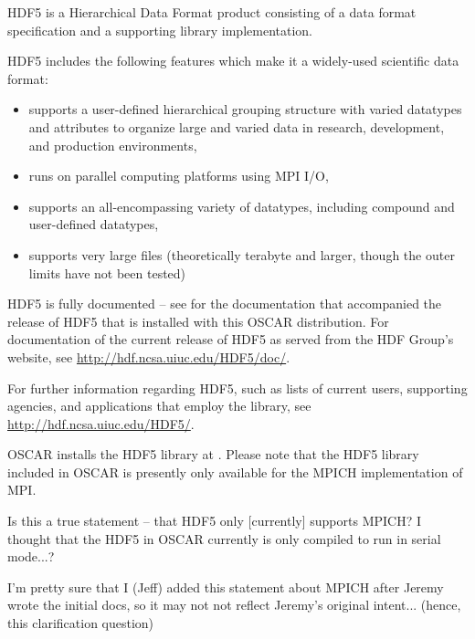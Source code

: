 %
%
%

HDF5 is a Hierarchical Data Format product consisting of a data format
specification and a supporting library implementation.

HDF5 includes the following features which make it a widely-used
scientific data format:

\begin{itemize}
\item supports a user-defined hierarchical grouping structure with
  varied datatypes and attributes to organize large and varied data in
  research, development, and production environments,
\item runs on parallel computing platforms using MPI I/O,
\item supports an all-encompassing variety of datatypes, including
  compound and user-defined datatypes,
\item supports very large files (theoretically terabyte and larger,
  though the outer limits have not been tested)
\end{itemize}

HDF5 is fully documented -- see
 for the
documentation that accompanied the release of HDF5 that is installed
with this OSCAR distribution.  For documentation of the current
release of HDF5 as served from the HDF Group's website, see
\url{http://hdf.ncsa.uiuc.edu/HDF5/doc/}.

For further information regarding HDF5, such as lists of current
users, supporting agencies, and applications that employ the library,
see \url{http://hdf.ncsa.uiuc.edu/HDF5/}.

OSCAR installs the HDF5 library at
.  Please note that the HDF5
library included in OSCAR is presently only available for the MPICH
implementation of MPI.

\begin{discuss}
  Is this a true statement -- that HDF5 only [currently] supports
  MPICH?  I thought that the HDF5 in OSCAR currently is only compiled
  to run in serial mode...?
  
  I'm pretty sure that I (Jeff) added this statement about MPICH after
  Jeremy wrote the initial docs, so it may not not reflect Jeremy's
  original intent... (hence, this clarification question)
\end{discuss}
